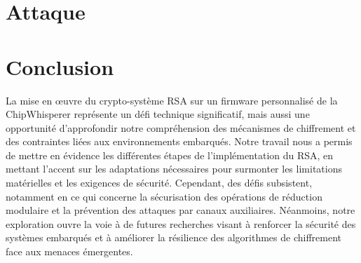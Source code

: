 \documentclass[12pt]{article}
\begin{document}
\section{Attaque}



\section*{Conclusion}
La mise en œuvre du crypto-système RSA sur un firmware personnalisé de la ChipWhisperer représente un défi technique significatif, mais aussi une opportunité d'approfondir notre compréhension des mécanismes de chiffrement et des contraintes liées aux environnements embarqués. Notre travail nous a permis de mettre en évidence les différentes étapes de l'implémentation du RSA, en mettant l'accent sur les adaptations nécessaires pour surmonter les limitations matérielles et les exigences de sécurité. Cependant, des défis subsistent, notamment en ce qui concerne la sécurisation des opérations de réduction modulaire et la prévention des attaques par canaux auxiliaires. Néanmoins, notre exploration ouvre la voie à de futures recherches visant à renforcer la sécurité des systèmes embarqués et à améliorer la résilience des algorithmes de chiffrement face aux menaces émergentes.

\medskip
\printbibliography
\end{document}
